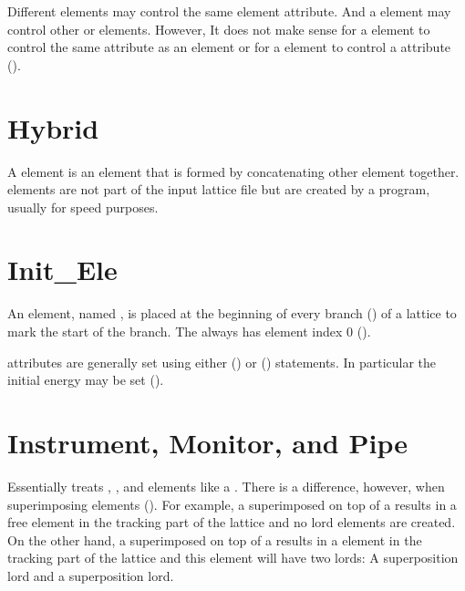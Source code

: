 Different  elements may control the same element
attribute. And a  element may control other 
 or  elements. However, It does not make sense
for a  element to control the same attribute as an
 element or for a  element to control a
 attribute ().

\section{Hybrid}
\label{s:hybrid}

A  element is an element that is formed by concatenating
other element together.  elements are not part of the input
lattice file but are created by a program, usually for speed purposes.

\section{Init_Ele}
\label{s:init.ele}

An  element, named , is placed at the
beginning of every branch () of a lattice to mark
the start of the branch. The  always has element index 0
().

 attributes are generally set using either 
() or  () statements.
In particular the initial energy may be set ().

\section{Instrument, Monitor, and Pipe}
\label{s:monitor}

Essentially \bmad treats , , and 
elements like a . There is a difference, however, when
superimposing elements (). For example, a
 superimposed on top of a  results in a free
 element in the tracking part of the lattice and no
lord elements are created. On the other hand, a 
superimposed on top of a  results in a 
element in the tracking part of the lattice and this 
element will have two lords: A  superposition lord and
a  superposition lord.

